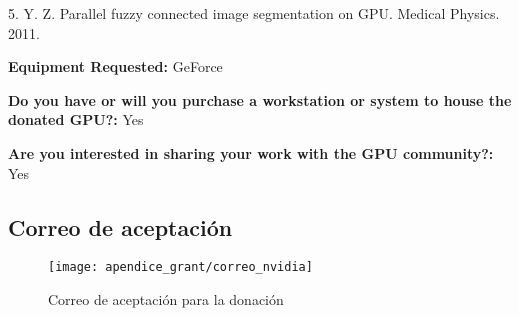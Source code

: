 5.	Y. Z. Parallel fuzzy connected image segmentation on GPU. Medical Physics. 2011.


\textbf{Equipment Requested:} GeForce

\textbf{Do you have or will you purchase a workstation or system to house the donated GPU?:} Yes

\textbf{Are you interested in sharing your work with the GPU community?:} Yes

\begin{landscape}
    \section{Correo de aceptación}
    \vspace*{1.5cm}
    \begin{figure}[H]
    \centering
    \texttt{[image: apendice\_grant/correo\_nvidia]}
    \caption{Correo de aceptación para la donación}\label{fig:aceptaccion}
    \end{figure}
\end{landscape}

